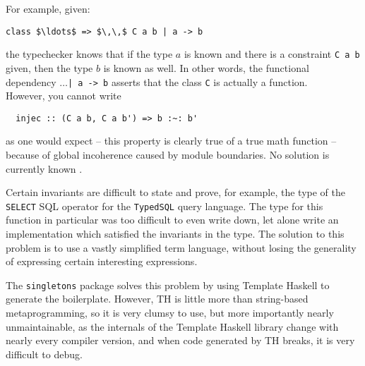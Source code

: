 \begin{description}[leftmargin=1em]
\item[Functional dependencies are \emph{not} equivalent to type families] 
  For example, given:
  \begin{lstlisting}[mathescape=true]
  class $\ldots$ => $\,\,$ C a b | a -> b
  \end{lstlisting}
  the typechecker knows that if the type $a$ is known and there is a constraint
  \lstinline{C a b} given, then the type $b$ is known as well. In other words, the functional 
  dependency $\ldots$\lstinline{| a -> b} asserts that the class \lstinline{C} is
  actually a function. \\ 
  However, you cannot write
  \begin{lstlisting}
  injec :: (C a b, C a b') => b :~: b' 
  \end{lstlisting}
  as one would expect -- this property is clearly true of a true math function --
  because of global incoherence caused by module boundaries. No solution 
  is currently known \cite{sof}.


\item[Exceeding complex type level invariants] Certain invariants are difficult to state and prove,
  for example, the type of the \texttt{SELECT} SQL operator for the \texttt{TypedSQL}
  query language. The type for this function in particular was too difficult to even 
  write down, let alone write an implementation which satisfied the invariants 
  in the type. The solution to this problem is to use a vastly simplified term language,
  without losing the generality of expressing certain interesting expressions. 

\item[Singletons have a lot of boilerplate code] The \texttt{singletons}
  package solves this problem by using Template Haskell to generate the
  boilerplate. However, TH is little more than string-based metaprogramming,
  so it is very clumsy to use, but more importantly nearly unmaintainable,
  as the internals of the Template Haskell library change with nearly every
  compiler version, and when code generated by TH breaks, it is very difficult
  to debug. 


\end{description}
